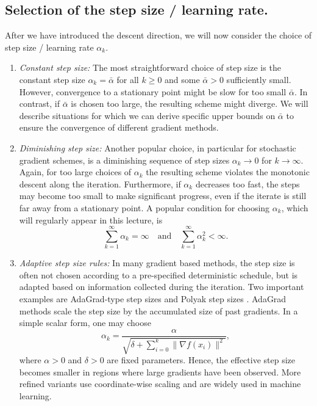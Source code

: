 \documentclass[12pt,openany]{book}
\theoremstyle{definition}
\theoremstyle{definition}
\begin{document}
\subsection{Selection of the step size / learning rate.}%
After we have introduced the descent direction, we will now consider the choice of step size / learning rate $\alpha_k$.
\begin{enumerate}
\item[a)] \textit{Constant step size:} The most straightforward choice of step size is the constant step size $\alpha_k=\bar \alpha$ for all $k\ge0$ and some $\bar \alpha>0$ sufficiently small. However, convergence to a stationary point might be slow for too small $\bar \alpha$. In contrast, if $\bar\alpha$ is chosen too large, the resulting scheme might diverge.  We will describe situations for which we can derive specific upper bounds on $\bar \alpha$ to ensure the convergence of different gradient methods.
\item[b)] \textit{Diminishing step size:} Another popular choice, in particular for stochastic gradient schemes, is a diminishing sequence of step sizes $\alpha_k\to 0$ for $k\to\infty$. Again, for too large choices of $\alpha_k$ the resulting scheme violates the monotonic descent along the iteration. Furthermore, if $\alpha_k$ decreases too fast, the steps may become too small to make significant
progress, even if the iterate is still far away from a stationary point. A popular condition for choosing $\alpha_k$, which will regularly appear in this lecture, is 
\[ \sum_{k=1}^\infty \alpha_k = \infty\quad \text{and}\quad \sum_{k=1}^\infty \alpha_k^2<\infty.\]
\item[c)] \textit{Adaptive step size rules:} In many gradient based methods, the step size is often not chosen according to a
pre-specified deterministic schedule, but is adapted based on information collected during the
iteration. Two important examples are AdaGrad-type step sizes \cite{JMLR:v12:duchi11a,tieleman2012rmsprop,zeiler2012adadeltaadaptivelearningrate} and Polyak step sizes \cite{hazan2022revisitingpolyakstepsize}. AdaGrad methods scale the step size by the accumulated size of past gradients. In a simple scalar
form, one may choose
\[
\alpha_k
=
\frac{\alpha}{\sqrt{\delta+\sum_{i=0}^{k}\|\nabla f(x_i)\|^2}},
\]
where $\alpha>0$ and $\delta>0$ are fixed parameters. Hence, the effective step size becomes
smaller in regions where large gradients have been observed. More refined variants use coordinate-wise scaling and are widely used in machine learning.


\end{enumerate}
\end{document}
